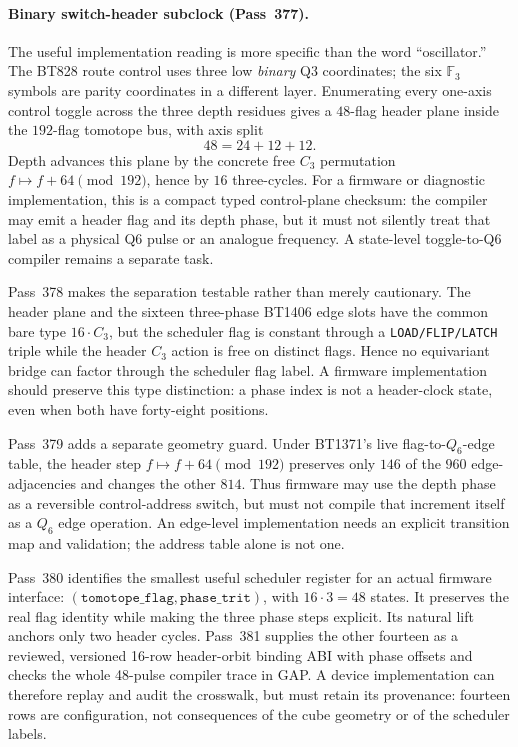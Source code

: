 \documentclass[11pt]{article}
\begin{document}
\paragraph{Binary switch-header subclock (Pass~377).}
The useful implementation reading is more specific than the word
``oscillator.''  The BT828 route control uses three low \emph{binary} Q3
coordinates; the six \(\mathbb F_3\) symbols are parity coordinates in a
different layer.  Enumerating every one-axis control toggle across the three
depth residues gives a $48$-flag header plane inside the $192$-flag tomotope
bus, with axis split
\[
  48=24+12+12.
\]
Depth advances this plane by the concrete free $C_3$ permutation
\(f\mapsto f+64\pmod {192}\), hence by $16$ three-cycles.  For a firmware or
diagnostic implementation, this is a compact typed control-plane checksum:
the compiler may emit a header flag and its depth phase, but it must not
silently treat that label as a physical Q6 pulse or an analogue frequency.  A
state-level toggle-to-Q6 compiler remains a separate task.

Pass~378 makes the separation testable rather than merely cautionary.  The
header plane and the sixteen three-phase BT1406 edge slots have the common bare
type \(16\cdot C_3\), but the scheduler flag is constant through a
\texttt{LOAD/FLIP/LATCH} triple while the header \(C_3\) action is free on
distinct flags.  Hence no equivariant bridge can factor through the scheduler
flag label.  A firmware implementation should preserve this type distinction:
a phase index is not a header-clock state, even when both have forty-eight
positions.

Pass~379 adds a separate geometry guard.  Under BT1371's live
flag-to-\(Q_6\)-edge table, the header step
\(f\mapsto f+64\pmod {192}\) preserves only \(146\) of the \(960\)
edge-adjacencies and changes the other \(814\).  Thus firmware may use the
depth phase as a reversible control-address switch, but must not compile that
increment itself as a \(Q_6\) edge operation.  An edge-level implementation
needs an explicit transition map and validation; the address table alone is
not one.

Pass~380 identifies the smallest useful scheduler register for an actual
firmware interface: \((\texttt{tomotope\_flag},\texttt{phase\_trit})\), with
\(16\cdot3=48\) states.  It preserves the real flag identity while making the
three phase steps explicit.  Its natural lift anchors only two header cycles.
Pass~381 supplies the other fourteen as a reviewed, versioned 16-row
header-orbit binding ABI with phase offsets and checks the whole 48-pulse
compiler trace in GAP.  A device implementation can therefore replay and
audit the crosswalk, but must retain its provenance: fourteen rows are
configuration, not consequences of the cube geometry or of the scheduler
labels.
\end{document}
